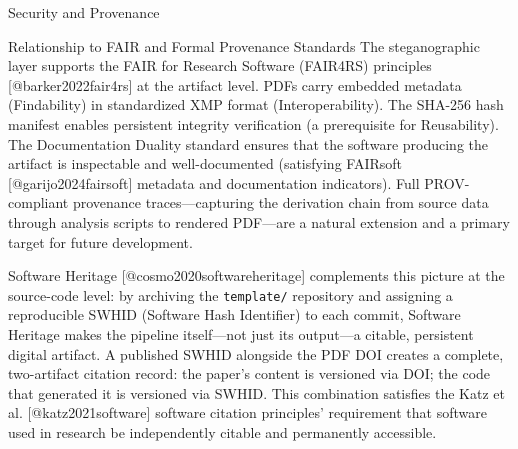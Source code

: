 \documentclass[
  ignorenonframetext,
]{beamer}
\begin{document}
\begin{frame}[fragile]{Security and Provenance}
\begin{block}{Relationship to FAIR and Formal Provenance Standards}
\protect{}\label{relationship-to-fair-and-formal-provenance-standards}
The steganographic layer supports the FAIR for Research Software
(FAIR4RS) principles {[}@barker2022fair4rs{]} at the artifact level.
PDFs carry embedded metadata (Findability) in standardized XMP format
(Interoperability). The SHA-256 hash manifest enables persistent
integrity verification (a prerequisite for Reusability). The
Documentation Duality standard ensures that the software producing the
artifact is inspectable and well-documented (satisfying FAIRsoft
{[}@garijo2024fairsoft{]} metadata and documentation indicators). Full
PROV-compliant provenance traces---capturing the derivation chain from
source data through analysis scripts to rendered PDF---are a natural
extension and a primary target for future development.

Software Heritage {[}@cosmo2020softwareheritage{]} complements this
picture at the source-code level: by archiving the \texttt{template/}
repository and assigning a reproducible SWHID (Software Hash Identifier)
to each commit, Software Heritage makes the pipeline itself---not just
its output---a citable, persistent digital artifact. A published SWHID
alongside the PDF DOI creates a complete, two-artifact citation record:
the paper's content is versioned via DOI; the code that generated it is
versioned via SWHID. This combination satisfies the Katz et al.
{[}@katz2021software{]} software citation principles' requirement that
software used in research be independently citable and permanently
accessible.
\end{block}
\end{frame}
\end{document}

